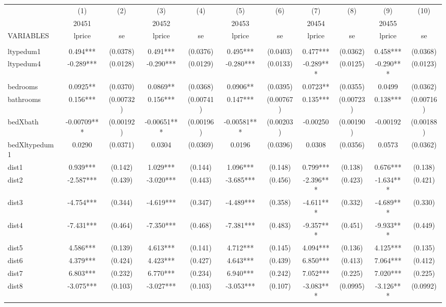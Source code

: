 \documentclass[]{article}
\begin{document}
\begin{tabular}{lcccccccccc} \hline
 & (1) & (2) & (3) & (4) & (5) & (6) & (7) & (8) & (9) & (10) \\
 & 20451 &  & 20452 &  & 20453 &  & 20454 &  & 20455 &  \\
VARIABLES & lprice & se & lprice & se & lprice & se & lprice & se & lprice & se \\ \hline
 &  &  &  &  &  &  &  &  &  &  \\
ltypedum1 & 0.494*** & (0.0378) & 0.491*** & (0.0376) & 0.495*** & (0.0403) & 0.477*** & (0.0362) & 0.458*** & (0.0368) \\
ltypedum4 & -0.289*** & (0.0128) & -0.290*** & (0.0129) & -0.280*** & (0.0133) & -0.289*** & (0.0125) & -0.290*** & (0.0123) \\
bedrooms & 0.0925** & (0.0370) & 0.0869** & (0.0368) & 0.0906** & (0.0395) & 0.0723** & (0.0355) & 0.0499 & (0.0362) \\
bathrooms & 0.156*** & (0.00732) & 0.156*** & (0.00741) & 0.147*** & (0.00767) & 0.135*** & (0.00723) & 0.138*** & (0.00716) \\
bedXbath & -0.00709*** & (0.00192) & -0.00651*** & (0.00196) & -0.00581*** & (0.00203) & -0.00250 & (0.00190) & -0.00192 & (0.00188) \\
bedXltypedum1 & 0.0290 & (0.0371) & 0.0304 & (0.0369) & 0.0196 & (0.0396) & 0.0308 & (0.0356) & 0.0573 & (0.0362) \\
dist1 & 0.939*** & (0.142) & 1.029*** & (0.144) & 1.096*** & (0.148) & 0.799*** & (0.138) & 0.676*** & (0.138) \\
dist2 & -2.587*** & (0.439) & -3.020*** & (0.443) & -3.685*** & (0.456) & -2.396*** & (0.423) & -1.634*** & (0.421) \\
dist3 & -4.754*** & (0.344) & -4.619*** & (0.347) & -4.489*** & (0.358) & -4.611*** & (0.332) & -4.689*** & (0.330) \\
dist4 & -7.431*** & (0.464) & -7.350*** & (0.468) & -7.381*** & (0.483) & -9.357*** & (0.451) & -9.933*** & (0.449) \\
dist5 & 4.586*** & (0.139) & 4.613*** & (0.141) & 4.712*** & (0.145) & 4.094*** & (0.136) & 4.125*** & (0.135) \\
dist6 & 4.379*** & (0.424) & 4.423*** & (0.427) & 4.643*** & (0.439) & 6.850*** & (0.413) & 7.064*** & (0.412) \\
dist7 & 6.803*** & (0.232) & 6.770*** & (0.234) & 6.940*** & (0.242) & 7.052*** & (0.225) & 7.020*** & (0.225) \\
dist8 & -3.075*** & (0.103) & -3.027*** & (0.103) & -3.053*** & (0.107) & -3.083*** & (0.0995) & -3.126*** & (0.0992) \\

\end{tabular}
\end{document}
